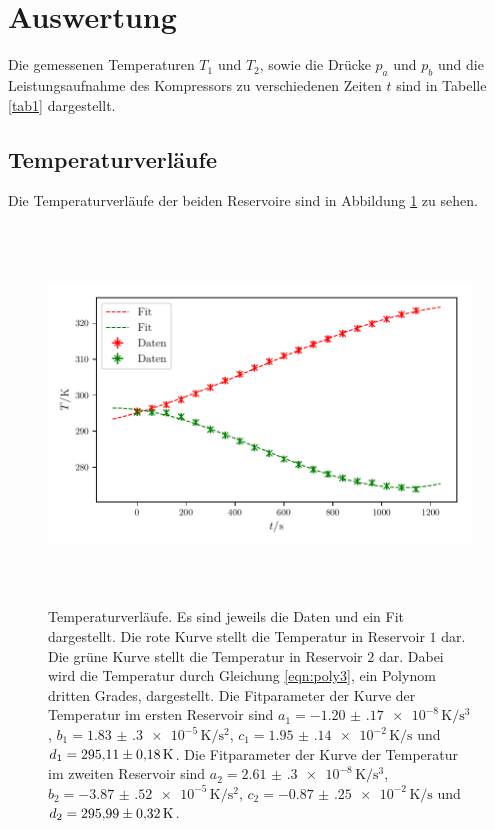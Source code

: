 \section{Auswertung}
\label{sec:Auswertung}

Die gemessenen Temperaturen $T_1$ und $T_2$, sowie die Drücke
$p_a$ und $p_b$ und die Leistungsaufnahme des Kompressors
zu verschiedenen Zeiten $t$ sind in Tabelle \ref{tab1}
dargestellt.


\subsection{Temperaturverläufe}
Die Temperaturverläufe der beiden Reservoire sind in Abbildung
\ref{fig:plot1} zu sehen.

\begin{figure} %
    \centering
    \includegraphics[width=14cm, height=10cm]{build/plot1.pdf}
    \caption{Temperaturverläufe. Es sind jeweils die Daten und ein Fit dargestellt.
    Die rote Kurve stellt die Temperatur in Reservoir $\num{1}$ dar. Die grüne Kurve stellt 
    die Temperatur in Reservoir $\num{2}$ dar. Dabei wird die Temperatur
    durch Gleichung \ref{eqn:poly3}, ein Polynom dritten Grades, dargestellt. 
    Die Fitparameter der Kurve der Temperatur im ersten Reservoir sind $a_1=\num{-1.20(17)e-8} \, \si{\kelvin\per\cubic\second}$,
    $b_1=\num{1.83(30)e-5}\, \si{\kelvin\per\square\second}$, $c_1=\num{1.95(14)e-2} \, \si{\kelvin\per\second}$ und $d_1=\num{295.11 \pm 0.18} \, \si{\kelvin}$.
    Die Fitparameter der Kurve der Temperatur im zweiten Reservoir sind $a_2=\num{2.61(30)e-8} \, \si{\kelvin\per\cubic\second}$,
$b_2=\num{-3.87(52)e-5} \, \si{\kelvin\per\square\second}$, $c_2=\num{-0.87(25)e-2} \, \si{\kelvin\per\second}$ und $d_2=\num{295.99 \pm 0.32} \, \si{\kelvin}$.} %

    \label{fig:plot1}
\end{figure}

